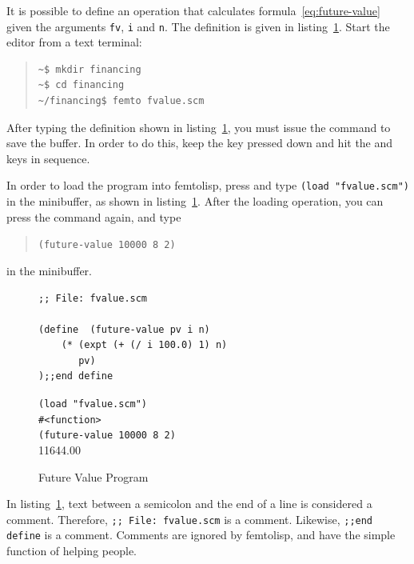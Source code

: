 \documentclass[a4paper,12pt]{book}
\newenvironment{fmpage}[1]
               {\begin{lrbox}{\fmbox}\begin{minipage}{#1}}
               {\end{minipage}\end{lrbox}\fbox{\usebox{\fmbox}}}
\begin{document}
It is possible to define an operation that
calculates formula~\ref{eq:future-value}
given the arguments \verb|fv|, \verb|i|
and \verb|n|. The definition is given
in listing~\ref{Texan:parking}.
Start the editor from a text terminal:
\begin{quote}
\begin{verbatim}
~$ mkdir financing
~$ cd financing
~/financing$ femto fvalue.scm
\end{verbatim}
\end{quote}
After typing the definition shown
in listing~\ref{Texan:parking},
you must issue the 
command to save the buffer.
In order to do this, keep the
 key pressed down and
hit the  and
 keys in sequence.

In order to load the program into
femtolisp, press 
and type \verb|(load "fvalue.scm")|
in the minibuffer, as shown in
listing~\ref{Texan:parking}.
After the loading operation,
you can press the
 command again,
and type
\begin{quote}
  \verb|(future-value 10000 8 2)|
\end{quote}
in the minibuffer.

\begin{figure}[!h]
\begin{fmpage}{0.8\textwidth}
\begin{verbatim}
;; File: fvalue.scm

(define  (future-value pv i n)
    (* (expt (+ (/ i 100.0) 1) n) 
       pv)
);;end define
\end{verbatim}
\end{fmpage}

\begin{fmpage}{0.8\textwidth}
  \verb|(load "fvalue.scm")|\\
  \verb|#<function>|\\
  \verb|(future-value 10000 8 2)|\\
  11644.00
\end{fmpage}
\caption{Future Value Program}
\label{Texan:parking}
\end{figure}

In listing~\ref{Texan:parking}, text
between a semicolon and the end of
a line is considered a comment.
Therefore, \verb|;; File: fvalue.scm|
is a comment. Likewise, \verb|;;end define|
is a comment. Comments are ignored by
femtolisp, and have the simple function of
helping people.
\end{document}
